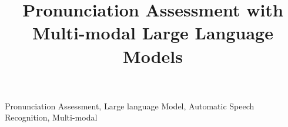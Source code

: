 \documentclass{article}
\title{Pronunciation Assessment with Multi-modal Large Language Models}
\begin{document}
\ninept
%
\maketitle
%
\begin{abstract}

\end{abstract}
%
\begin{keywords}
Pronunciation Assessment, Large language Model, Automatic Speech Recognition, Multi-modal
\end{keywords}











%

%
%

\small

\end{document}
